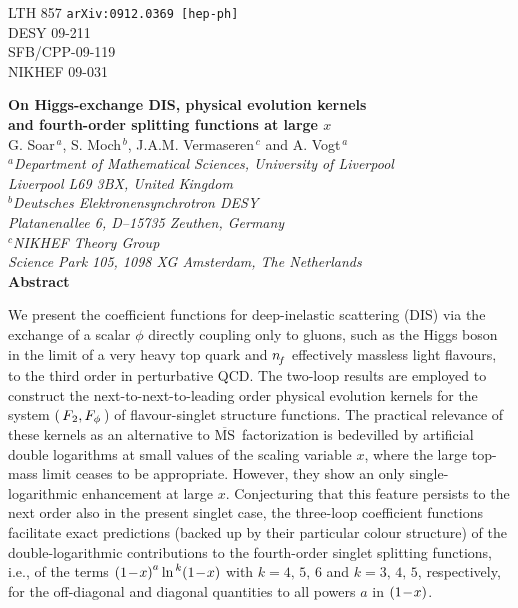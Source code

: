 \documentclass[12pt]{article}
\newcommand{\MSb}{$\overline{\mbox{MS}}$}
\begin{document}
\begin{titlepage}
\noindent
LTH 857 \hfill {\tt arXiv:0912.0369 [hep-ph]}\\
DESY 09-211 \\
SFB/CPP-09-119 \\
NIKHEF 09-031 
\vspace{1.1cm}
%
\begin{center}
\Large
{\bf On Higgs-exchange DIS, physical evolution kernels} \\
\vspace{0.15cm}
{\bf and fourth-order splitting functions at large \boldmath $x$} \\
\vspace{1.6cm}
%
\large
%
G. Soar$^{\, a}$, S. Moch$^{\, b}$, J.A.M. Vermaseren$^{\, c}$ 
and A. Vogt$^{\, a}$\\
\vspace{1cm}
%
\normalsize
{\it $^a$Department of Mathematical Sciences, University of Liverpool \\
\vspace{0.1cm}
Liverpool L69 3BX, United Kingdom}\\
\vspace{0.5cm}
{\it $^b$Deutsches Elektronensynchrotron DESY \\
\vspace{0.1cm}
Platanenallee 6, D--15735 Zeuthen, Germany}\\
\vspace{0.5cm}
{\it $^c$NIKHEF Theory Group \\
\vspace{0.1cm}
Science Park 105, 1098 XG Amsterdam, The Netherlands} \\
\vfill
%
\large
{\bf Abstract}
\vspace{-0.2cm}
\end{center}
%
We present the coefficient functions for deep-inelastic scattering (DIS) via 
the exchange of a scalar $\phi$ directly coupling only to gluons, such as the 
Higgs boson in the limit of a very heavy top quark and ${n^{}_{\! f}}$ effectively 
massless light flavours, to the third order in perturbative QCD.
The two-loop results are employed to construct the next-to-next-to-leading 
order physical evolution kernels for the system $(\,{F_{\:\! 2}}, F_{\phi\,}$) of 
flavour-singlet structure functions. The practical relevance of these kernels 
as an alternative to \MSb\ factorization is bedevilled by artificial double 
logarithms at small values of the scaling variable $x$, where the large 
top-mass limit ceases to be appropriate.
However, they show an only single-logarithmic enhancement at large $x$.
Conjecturing that this feature persists to the next order also in the present 
singlet case, the three-loop coefficient functions facilitate exact predictions
(backed up by their particular colour structure) of the double-logarithmic 
contributions to the fourth-order singlet splitting functions, i.e., of the 
terms $\x1^a \ln^{\,k} \! \x1$ with $k = 4,\,5,\,6$ and $k = 3,\,4,\,5$, 
respectively, for the off-diagonal and diagonal quantities to all powers $a$ in
$\x1$. 
%
\vspace*{0.2cm}
\end{titlepage}
%
%
\end{document}
